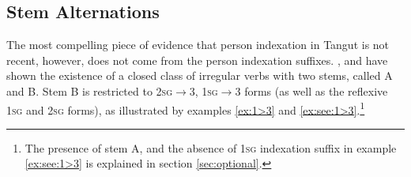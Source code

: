 \documentclass[oldfontcommands,oneside,a4paper,11pt]{article}
\newcommand{\ipa}[1]{{\phon \mbox{#1}}} %
\begin{document}
%
%
%


\subsection{Stem Alternations}
The most compelling piece of evidence that person indexation in Tangut is not recent, however, does not come from the person indexation suffixes. \citet{gong01huying}, \citet{jacques09tangutverb} and \citet{jacques14esquisse} have shown the existence of a closed class of irregular verbs with two stems, called A and B. Stem B is restricted to \textsc{2sg}$\rightarrow$3, \textsc{1sg}$\rightarrow$3 forms (as well as the reflexive \textsc{1sg} and \textsc{2sg} forms), as illustrated by examples \ref{ex:1>3} and \ref{ex:see:1>3}.\footnote{The presence of stem A, and the absence of \textsc{1sg} indexation suffix in example \ref{ex:see:1>3} is explained in section \ref{sec:optional}.}
\end{document}
